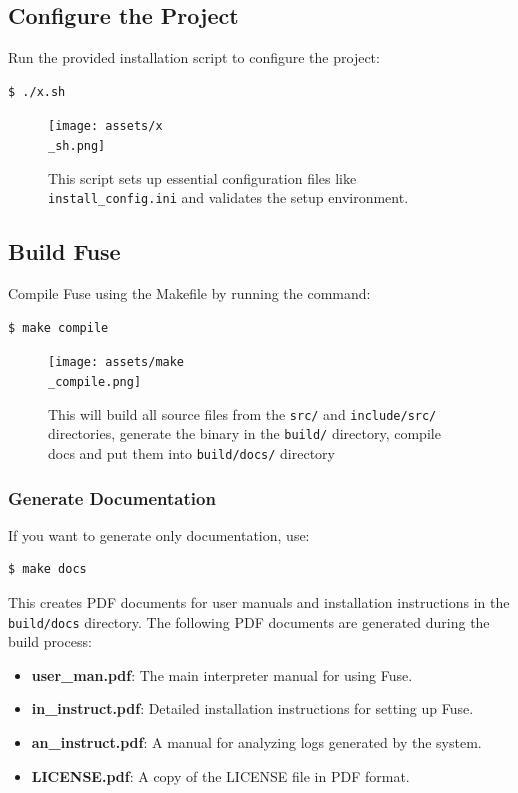 \documentclass[a4paper,12pt]{article}
\begin{document}
\subsection{Configure the Project}
Run the provided installation script to configure the project:
\begin{lstlisting}[language=bash]
$ ./x.sh
\end{lstlisting}
\begin{figure}[h]
	\centering
	\texttt{[image: assets/x\\\_sh.png]}
	\caption{This script sets up essential configuration files like \texttt{install\_config.ini} and validates the setup environment.}
\end{figure}

\newpage

\subsection{Build Fuse}
Compile Fuse using the Makefile by running the command:
\begin{lstlisting}[language=bash]
$ make compile
\end{lstlisting}
\begin{figure}[h]
	\centering
	\texttt{[image: assets/make\\\_compile.png]}
	\caption{This will build all source files from the \texttt{src/} and \texttt{include/src/} directories, generate the binary in the \texttt{build/} directory, compile docs and put them into \texttt{build/docs/} directory}
\end{figure}


\subsubsection{Generate Documentation}
If you want to generate only documentation, use:
\begin{lstlisting}[language=bash]
$ make docs
\end{lstlisting}
This creates PDF documents for user manuals and installation instructions in the \texttt{build/docs} directory.
The following PDF documents are generated during the build process:
\begin{itemize}
	\item \textbf{user\_man.pdf}: The main interpreter manual for using Fuse.
	\item \textbf{in\_instruct.pdf}: Detailed installation instructions for setting up Fuse.
	\item \textbf{an\_instruct.pdf}: A manual for analyzing logs generated by the system.
	\item \textbf{LICENSE.pdf}: A copy of the LICENSE file in PDF format.
\end{itemize}
\end{document}
